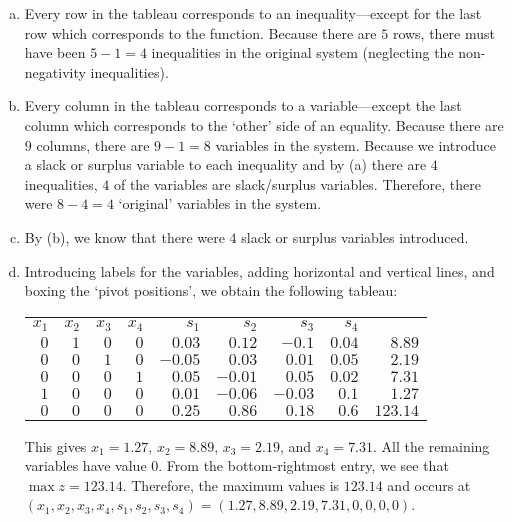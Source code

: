 \documentclass[11pt,letterpaper]{article}
\begin{document}
\sol 
\begin{enumerate}[(a)]
\item Every row in the tableau corresponds to an inequality---except for the last row which corresponds to the function. Because there are $5$ rows, there must have been $5 - 1= 4$ inequalities in the original system (neglecting the non-negativity inequalities). 

\item Every column in the tableau corresponds to a variable---except the last column which corresponds to the `other' side of an equality. Because there are $9$ columns, there are $9 - 1= 8$ variables in the system. Because we introduce a slack or surplus variable to each inequality and by (a) there are $4$ inequalities, $4$ of the variables are slack/surplus variables. Therefore, there were $8 - 4= 4$ `original' variables in the system. 

\item By (b), we know that there were $4$ slack or surplus variables introduced. 

\item Introducing labels for the variables, adding horizontal and vertical lines, and boxing the `pivot positions', we obtain the following tableau: \par
	\begin{table}[H]
	\centering
	\begin{tabular}{rrrrrrrrr}
	{\footnotesize $x_1$} & {\footnotesize $x_2$} & {\footnotesize $x_3$} & {\footnotesize $x_4$} & {\footnotesize $s_1$} & {\footnotesize $s_2$} & {\footnotesize $s_3$} & {\footnotesize $s_4$} & \\
	$0$ & $\boxed{1}$ & $0$ & $0$ & $0.03$ & $0.12$ & $-0.1$ & \multicolumn{1}{r|}{$0.04$} & $8.89$ \\
	$0$ & $0$ & $\boxed{1}$ & $0$ & $-0.05$ & $0.03$ & $0.01$ & \multicolumn{1}{r|}{$0.05$} & $2.19$ \\
	$0$ & $0$ & $0$ & $\boxed{1}$ & $0.05$ & $-0.01$ & $0.05$ & \multicolumn{1}{r|}{$0.02$} & $7.31$ \\
	$\boxed{1}$ & $0$ & $0$ & $0$ & $0.01$ & $-0.06$ & $-0.03$ & \multicolumn{1}{r|}{$0.1$} & $1.27$ \\ \hline
	$0$ & $0$ & $0$ & $0$ & $0.25$ & $0.86$ & $0.18$ & \multicolumn{1}{r|}{$0.6$} & $123.14$
	\end{tabular}
	\end{table} \par
This gives $x_1= 1.27$, $x_2= 8.89$, $x_3= 2.19$, and $x_4= 7.31$. All the remaining variables have value $0$. From the bottom-rightmost entry, we see that $\max z= 123.14$. Therefore, the maximum values is $123.14$ and occurs at $(x_1, x_2, x_3, x_4, s_1, s_2, s_3, s_4)= (1.27, 8.89, 2.19, 7.31, 0, 0, 0, 0)$. 
\end{enumerate}
\end{document}
